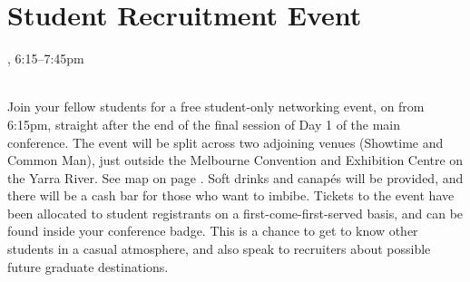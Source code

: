 \clearpage
\section{Student Recruitment Event}
\setheaders{}{\daydateyear}

\begin{center}



\daydateyear, 6:15--7:45pm \vspace{1em}\\
\StudentLunchLoc \\
\end{center}

Join your fellow students for a free student-only networking event, on
\daydate from 6:15pm, straight after the end of the final session of Day
1 of the main conference. The event will be split across two adjoining
venues (Showtime and Common Man), just outside the Melbourne Convention
and Exhibition Centre on the Yarra River.  
See map on page \pageref{page:surrounds-map}.
Soft drinks and canap\'es
will be provided, and there will be a cash bar for those who want to
imbibe. Tickets to the event have been allocated to student registrants
on a first-come-first-served basis, and can be found inside your
conference badge. This is a chance to get to know other students in a
casual atmosphere, and also speak to recruiters about possible future
graduate destinations.
